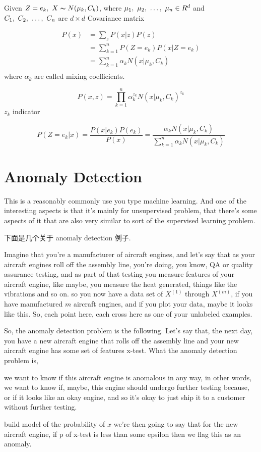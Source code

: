 \documentclass{article}
\begin{document}
Given $Z = e_k,\ X \thicksim{N}(\mu_k, C_k)$, where $\mu_1,~\mu_2,~\ldots,~\mu_n \in R^d$ and $C_1,~C_2,~\ldots,~C_n$ are $d \times d$ Covariance matrix

$$
\begin{aligned}
P(x)
& = \sum_z P(x|z)P(z) \\
& = \sum_{k=1}^n P(Z=e_k) P(x|Z = e_k)\\
& = \sum_{k=1}^n \alpha_k N(x|\mu_k,C_k) \\
\end{aligned}
$$
where $\alpha_k$ are called mixing coefficients.

$$
P(x,z) = \prod_{k=1}^n \alpha_k^{z_k} N(x|\mu_k, C_k)^{z_k}
$$
$z_k$ indicator

$$
P(Z=e_k|x) = \dfrac{P(x|e_k) P(e_k)}{P(x)} =  \dfrac{\alpha_k N(x|\mu_k,C_k)}{\sum_{k=1}^n \alpha_k N(x|\mu_k,C_k)}
$$

\section{Anomaly Detection}
This is a reasonably commonly use you type machine learning. 
And one of the interesting aspects is that it's mainly for unsupervised problem, that there's some aspects of it that are also very similar to sort of the supervised learning problem.

下面是几个关于 anomaly detection 例子.
\begin{example}
Imagine that you're a manufacturer of aircraft engines, and let's say that as your aircraft engines roll off the assembly line, 
you're doing, you know, QA or quality assurance testing, and as part of that testing you measure features of your aircraft engine, like maybe, 
you measure the heat generated, things like the vibrations and so on.
so you now have a data set of $X^{(1)}$ through $X^{(m)}$, if you have manufactured $m$ aircraft engines,
and if you plot your data, maybe it looks like this.
So, each point here, each cross here as one of your unlabeled examples. 

So, the anomaly detection problem is the following. 
Let's say that, the next day, you have a new aircraft engine that rolls off the assembly line and your new aircraft engine has some set of features x-test. 
What the anomaly detection problem is,

we want to know if this aircraft engine is anomalous in any way, in other words, we want to know if, maybe, this engine should undergo further testing because, or if it looks like an okay engine, and so it's okay to just ship it to a customer without further testing.

build model of the probability of $x$
we're then going to say that for the new aircraft engine, if p of x-test is less than some epsilon then we flag this as an anomaly.
\end{example}
\end{document}
